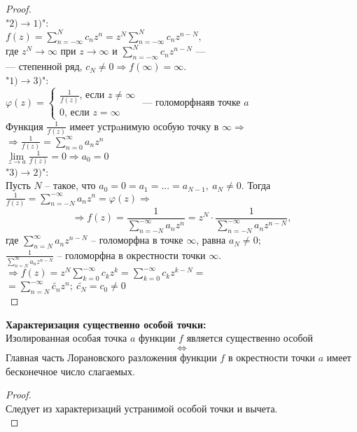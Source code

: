 \begin{proof}
    \ \\
    "$2) \to 1)$":\\
    $f(z)=\sum_{n=-\infty}^N c_n z^n=z^N\sum_{n=-\infty}^N c_n z^{n-N},$\\
    где $z^N\to \infty$ при $z\to \infty$ и $\sum_{n=-\infty}^N c_n z^{n-N}$ --- \\
    --- степенной ряд, $c_{N} \neq 0 \Rightarrow f(\infty) = \infty$.\\[2mm]
    "$1) \to 3)$":\\
    $\varphi(z)=
    \begin{cases}
        \frac{1}{f(z)}\text{, если }z\neq \infty\\
        0\text{, если }z=\infty
    \end{cases}
    \text{ --- голоморфнаяв точке }a$\\
    Функция $\frac{1}{f(z)}$ имеет устрaнимую особую точку в $\infty \Rightarrow$ \\ 
    $\Rightarrow \frac{1}{f(z)}=\sum_{n=0}^\infty a_n z^n$\\
    $\lim\limits_{z\to a}\frac{1}{f(z)}=0 \Rightarrow a_0 =0$\\[2mm]
    "$3) \to 2)$":\\
    Пусть $N$ -- такое, что $a_0 = 0 = a_1=...=a_{N-1}, \ a_N \neq 0$.   Тогда $\frac{1}{f(z)}=\sum_{n=-N}^{-\infty} a_n z^n=\varphi(z) \Rightarrow $
    $$\Rightarrow f(z)=\frac{1}{\sum_{n=-N}^{-\infty} a_n z^n}={z^N}\cdot \frac{1}{\sum_{n=-N}^{-\infty} a_n z^{n-N}},$$
    где $\sum_{n=N}^\infty a_n z^{n-N}$ -- голоморфна в точке $\infty$, равна $a_N \neq 0$;\\
    $\frac{1}{\sum_{n=N}^\infty a_n z^{n-N}}$ -- голоморфна в окрестности точки $\infty$.\\
    $\Rightarrow f(z)=z^N\sum_{k=0}^{-\infty} c_k z^k = \sum_{k=0}^{-\infty} c_k z^{k-N}=$\\
    $=\sum_{n=N}^{-\infty} \tilde{c_n}z^n; \ \tilde{c_{N}}=c_0\neq 0$\\[2mm]
\end{proof}

\textbf{Характеризация существенно особой точки:}\\
Изолированная особая точка $a$ функции $f$ является существенно особой
$$\Leftrightarrow$$
Главная часть Лорановского разложения функции $f$ в окрестности точки $a$ имеет бесконечное число слагаемых.\\
\begin{proof}
    \ \\
    Следует из характеризаций устранимой особой точки и вычета.\\[2mm]
\end{proof}


